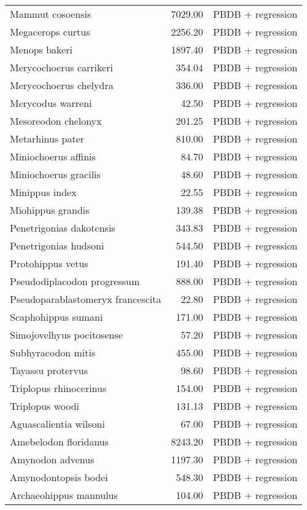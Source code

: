 \begin{table}[ht]
\begin{tabular}{lrl}
  Mammut cosoensis & 7029.00 & PBDB + regression \\ 
  Megacerops curtus & 2256.20 & PBDB + regression \\ 
  Menops bakeri & 1897.40 & PBDB + regression \\ 
  Merycochoerus carrikeri & 354.04 & PBDB + regression \\ 
  Merycochoerus chelydra & 336.00 & PBDB + regression \\ 
  Merycodus warreni & 42.50 & PBDB + regression \\ 
  Mesoreodon chelonyx & 201.25 & PBDB + regression \\ 
  Metarhinus pater & 810.00 & PBDB + regression \\ 
  Miniochoerus affinis & 84.70 & PBDB + regression \\ 
  Miniochoerus gracilis & 48.60 & PBDB + regression \\ 
  Minippus index & 22.55 & PBDB + regression \\ 
  Miohippus grandis & 139.38 & PBDB + regression \\ 
  Penetrigonias dakotensis & 343.83 & PBDB + regression \\ 
  Penetrigonias hudsoni & 544.50 & PBDB + regression \\ 
  Protohippus vetus & 191.40 & PBDB + regression \\ 
  Pseudodiplacodon progressum & 888.00 & PBDB + regression \\ 
  Pseudoparablastomeryx francescita & 22.80 & PBDB + regression \\ 
  Scaphohippus sumani & 171.00 & PBDB + regression \\ 
  Simojovelhyus pocitosense & 57.20 & PBDB + regression \\ 
  Subhyracodon mitis & 455.00 & PBDB + regression \\ 
  Tayassu protervus & 98.60 & PBDB + regression \\ 
  Triplopus rhinocerinus & 154.00 & PBDB + regression \\ 
  Triplopus woodi & 131.13 & PBDB + regression \\ 
  Aguascalientia wilsoni & 67.00 & PBDB + regression \\ 
  Amebelodon floridanus & 8243.20 & PBDB + regression \\ 
  Amynodon advenus & 1197.30 & PBDB + regression \\ 
  Amynodontopsis bodei & 548.30 & PBDB + regression \\ 
  Archaeohippus mannulus & 104.00 & PBDB + regression \\ 

\end{tabular}
\end{table}
